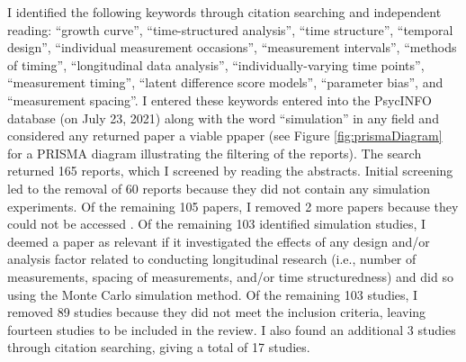\documentclass[
12pt, %
twoside,
english]{guelphthesis}
\begin{document}
I identified the following keywords through citation searching and independent reading: ``growth curve'', ``time-structured analysis'', ``time structure'', ``temporal design'', ``individual measurement occasions'', ``measurement intervals'', ``methods of timing'', ``longitudinal data analysis'', ``individually-varying time points'', ``measurement timing'', ``latent difference score models'', ``parameter bias'', and ``measurement spacing''. I entered these keywords entered into the PsycINFO database (on July 23, 2021) along with the word ``simulation'' in any field and considered any returned paper a viable ppaper (see Figure \ref{fig:prismaDiagram} for a PRISMA diagram illustrating the filtering of the reports). The search returned 165 reports, which I screened by reading the abstracts. Initial screening led to the removal of 60 reports because they did not contain any simulation experiments. Of the remaining 105 papers, I removed 2 more papers because they could not be accessed \autocite{stockdale2007,tiberio2008}. Of the remaining 103 identified simulation studies, I deemed a paper as relevant if it investigated the effects of any design and/or analysis factor related to conducting longitudinal research (i.e., number of measurements, spacing of measurements, and/or time structuredness) and did so using the Monte Carlo simulation method. Of the remaining 103 studies, I removed 89 studies because they did not meet the inclusion criteria, leaving fourteen studies to be included in the review. I also found an additional 3 studies through citation searching, giving a total of 17 studies.
\end{document}
